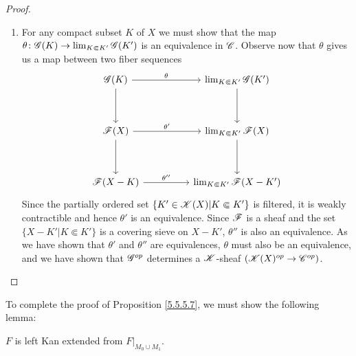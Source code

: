 \documentclass[../../thesis.tex]{subfiles}
\begin{document}
\begin{proof}
\begin{enumerate}
        \item For any compact subset $K$ of $X$ we must show that the map $\theta\colon \mathscr{G}(K)\to \lim_{K\Subset K'}\mathscr{G}(K')$ is an equivalence in $\mathscr{C}$.
              Observe now that $\theta$ gives us a map between two fiber sequences
              \[\begin{tikzcd}
                      {\G(K)} && {\lim_{K\Subset K'}\G(K')} \\
                      \\
                      {\F(X)} && {\lim_{K\Subset K'}\F(X)} \\
                      \\
                      {\F(X-K)} && {\lim_{K\Subset K'}\F(X-K')}
                      \arrow["\theta", from=1-1, to=1-3]
                      \arrow["{\theta'}", from=3-1, to=3-3]
                      \arrow["{\theta''}", from=5-1, to=5-3]
                      \arrow[from=1-1, to=3-1]
                      \arrow[from=3-1, to=5-1]
                      \arrow[from=1-3, to=3-3]
                      \arrow[from=3-3, to=5-3]
                  \end{tikzcd}\]
              Since the partially ordered set $\{K'\in \mathscr{K}(X) | K\Subset K'\}$ is filtered, it is weakly contractible and hence $\theta'$ is an equivalence.
              Since $\mathscr{F}$ is a sheaf and the set $\{X-K' | K \Subset K'\}$ is a covering sieve on $X-K'$, $\theta''$ is also an equivalence.
              As we have shown that $\theta'$ and $\theta''$ are equivalences, $\theta$ must also be an equivalence, and we have shown that $\mathscr{G}^{op}$ determines a $\mathscr{K}$-sheaf $(\mathscr{K}(X)^{op} \to \mathscr{C}^{op})$.
    \end{enumerate}
\end{proof}
To complete the proof of Proposition \ref{5.5.5.7}, we must show the following lemma:
\begin{lemma}
    $F$ is left Kan extended from $F|_{M_0\cup M_1}$.
\end{lemma}
\end{document}
